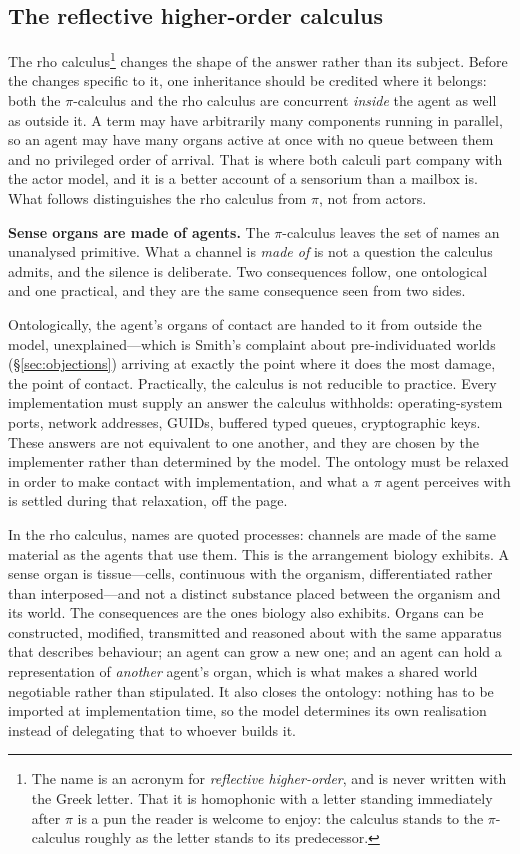 \documentclass[11pt,a4paper]{article}
\newcommand{\rhoc}{rho calculus}
\begin{document}
\subsection{The reflective higher-order calculus}
\label{sec:rho}

The \rhoc{}\footnote{The name is an acronym for \emph{reflective higher-order},
and is never written with the Greek letter. That it is homophonic with a letter
standing immediately after $\pi$ is a pun the reader is welcome to enjoy: the
calculus stands to the $\pi$-calculus roughly as the letter stands to its
predecessor.} \cite{meredith2005} changes the shape of the answer rather than its
subject. Before the changes specific to it, one inheritance should be credited
where it belongs: both the $\pi$-calculus and the \rhoc{} are concurrent
\emph{inside} the agent as well as outside it. A term may have arbitrarily many
components running in parallel, so an agent may have many organs active at once
with no queue between them and no privileged order of arrival. That is where both
calculi part company with the actor model, and it is a better account of a
sensorium than a mailbox is. What follows distinguishes the \rhoc{} from
$\pi$, not from actors.

\textbf{Sense organs are made of agents.} The $\pi$-calculus leaves the set of
names an unanalysed primitive. What a channel is \emph{made of} is not a
question the calculus admits, and the silence is deliberate. Two consequences
follow, one ontological and one practical, and they are the same consequence seen
from two sides.

Ontologically, the agent's organs of contact are handed to it from outside the
model, unexplained---which is Smith's complaint about pre-individuated worlds
(\S\ref{sec:objections}) arriving at exactly the point where it does the most
damage, the point of contact. Practically, the calculus is not reducible to
practice. Every implementation must supply an answer the calculus withholds:
operating-system ports, network addresses, GUIDs, buffered typed queues,
cryptographic keys. These answers are not equivalent to one another, and they are
chosen by the implementer rather than determined by the model. The ontology must
be relaxed in order to make contact with implementation, and what a $\pi$ agent
perceives with is settled during that relaxation, off the page.

In the \rhoc{}, names are quoted processes: channels are made of the same
material as the agents that use them. This is the arrangement biology exhibits. A
sense organ is tissue---cells, continuous with the organism, differentiated
rather than interposed---and not a distinct substance placed between the organism
and its world. The consequences are the ones biology also exhibits. Organs can be
constructed, modified, transmitted and reasoned about with the same apparatus
that describes behaviour; an agent can grow a new one; and an agent can hold a
representation of \emph{another} agent's organ, which is what makes a shared
world negotiable rather than stipulated. It also closes the ontology: nothing has
to be imported at implementation time, so the model determines its own
realisation instead of delegating that to whoever builds it.
\end{document}
